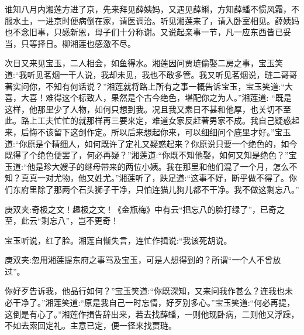 \begin{parag}
    谁知八月内湘莲方进了京，先来拜见薛姨妈，又遇见薛蝌，方知薛蟠不惯风霜，不服水土，一进京时便病倒在家，请医调治。听见湘莲来了，请入卧室相见。薛姨妈也不念旧事，只感新恩，母子们十分称谢。又说起亲事一节，凡一应东西皆已妥当，只等择日。柳湘莲也感激不尽。
\end{parag}


\begin{parag}
    次日又来见宝玉，二人相会，如鱼得水。湘莲因问贾琏偷娶二房之事，宝玉笑道:“我听见茗烟一干人说，我却未见，我也不敢多管。我又听见茗烟说，琏二哥哥著实问你，不知有何话说？”湘莲就将路上所有之事一概告诉宝玉，宝玉笑道:“大喜，大喜！难得这个标致人，果然是个古今绝色，堪配你之为人。”湘莲道: “既是这样，他那里少了人物，如何只想到我。况且我又素日不甚和他厚，也关切不至此。路上工夫忙忙的就那样再三要来定，难道女家反赶著男家不成。我自己疑惑起来，后悔不该留下这剑作定。所以后来想起你来，可以细细问个底里才好。”宝玉道:“你原是个精细人，如何既许了定礼又疑惑起来？你原说只要一个绝色的，如今既得了个绝色便罢了，何必再疑？”湘莲道:“你既不知他娶，如何又知是绝色？”宝玉道:“他是珍大嫂子的继母带来的两位小姨。我在那里和他们混了一个月，怎么不知？真真一对尤物，他又姓尤。”湘莲听了，跌足道:“这事不好，断乎做不得了。你们东府里除了那两个石头狮子干净，只怕连猫儿狗儿都不干净。我不做这剩忘八。”\begin{note}庚双夹:奇极之文！趣极之文！《金瓶梅》中有云“把忘八的脸打绿了”，已奇之至，此云“剩忘八”，岂不更奇！\end{note}宝玉听说，红了脸。湘莲自惭失言，连忙作揖说:“我该死胡说。\begin{note}庚双夹:忽用湘莲提东府之事骂及宝玉，可是人想得到的？所谓“一个人不曾放过”。\end{note}你好歹告诉我，他品行如何？”宝玉笑道:“你既深知，又来问我作甚么？连我也未必干净了。”湘莲笑道:“原是我自己一时忘情，好歹别多心。”宝玉笑道:“何必再提，这倒是有心了。”湘莲作揖告辞出来，若去找薛蟠，一则他现卧病，二则他又浮躁，不如去索回定礼。主意已定，便一径来找贾琏。
\end{parag}


